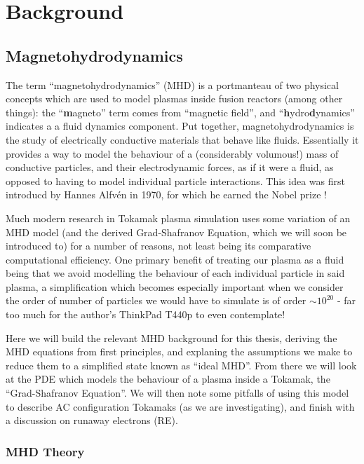 
\chapter{Background}
\label{chapter2}

\section{Magnetohydrodynamics}


The term ``magnetohydrodynamics'' (MHD) is a portmanteau of two physical concepts which are used to model plasmas 
inside fusion reactors (among other things): the ``\textbf{m}agneto'' term comes from ``magnetic field'', and ``\textbf{h}ydro\textbf{d}ynamics'' indicates a 
a fluid dynamics component. Put together, magnetohydrodynamics is the study of electrically conductive materials 
that behave like fluids. Essentially it provides a way to model the behaviour of a (considerably volumous!) 
mass of conductive particles, and their electrodynamic forces, as if it were a fluid, as opposed to having to model 
individual particle interactions. This idea was first introducd by Hannes Alfv\'en in 1970, for which he earned 
the Nobel prize \cite{alfven-mhd}!

Much modern research in Tokamak plasma simulation uses some variation of an MHD model (and the derived Grad-Shafranov Equation, which we will 
soon be introduced to) for a number of reasons, not least being its comparative computational efficiency.
One primary benefit of treating our plasma as a fluid being that we avoid modelling the behaviour of 
each individual particle in said plasma, a simplification which becomes especially important when we consider 
the order of number of particles we would have to simulate is of order $\sim 10^{20}$ - far too much 
for the author's ThinkPad T440p to even contemplate!

Here we will build the relevant MHD background for this thesis, deriving the MHD equations from first principles, 
and explaning the assumptions we make to reduce them to a simplified state known as ``ideal MHD''. From there we will 
look at the PDE which models the behaviour of a plasma inside a Tokamak, the ``Grad-Shafranov Equation''. We will 
then note some pitfalls of using this model to describe AC configuration Tokamaks (as we are investigating), 
and finish with a discussion on runaway electrons (RE).

\subsection{MHD Theory}

